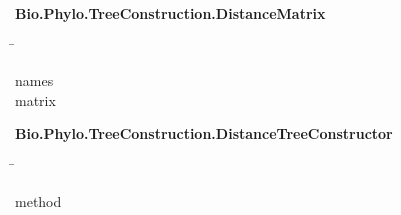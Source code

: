 \begin{leftbar}
    \textbf{Bio.Phylo.TreeConstruction.DistanceMatrix}
    \begin{nstabbing}
        \qquad\qquad\qquad\qquad\qquad\quad\=\kill
    
        names \\
        
        matrix 
    \end{nstabbing}
\end{leftbar}

\begin{leftbar}
    \textbf{Bio.Phylo.TreeConstruction.DistanceTreeConstructor}
    \begin{nstabbing}
        \qquad\qquad\qquad\qquad\qquad\quad\=\kill
    
        method 
        
    \end{nstabbing}
\end{leftbar}
